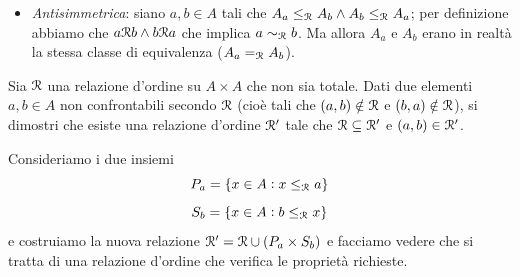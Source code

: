 \documentclass[a4paper]{article}\par \usepackage{style}\par
\begin{document}
\begin{enumerate}
\begin{itemize}
  \item \emph{Antisimmetrica}: siano $ a, b \in A $ tali che $ A_a \leq_{\mathcal{R}} A_b \wedge A_b \leq_{\mathcal{R}} A_a $; per definizione abbiamo che $ a \mathcal{R} b \wedge b \mathcal{R} a $ che implica $ a \sim_{\mathcal{R}} b $. Ma allora $ A_a $ e $ A_b $ erano in realtà la stessa classe di equivalenza ($ A_a =_{\mathcal{R}} A_b $).
  \end{itemize}
\end{enumerate}\par \begin{es}
  Sia $ \mathcal{R} $ una relazione d'ordine su $ A \times A $ che non sia totale. Dati due elementi $ a, b \in A $ non confrontabili secondo $ \mathcal{R} $ (cioè tali che $ (a, b) \notin \mathcal{R} $ e $ (b, a) \notin \mathcal{R} $), si dimostri che esiste una relazione d'ordine $ \mathcal{R}' $ tale che $ \mathcal{R} \subseteq \mathcal{R}' $ e $ (a, b) \in \mathcal{R}' $.
\end{es}\par 
Consideriamo i due insiemi
\[P_a = \{x \in A : x \leq_{\mathcal{R}} a\}\]
\[S_b = \{x \in A : b \leq_{\mathcal{R}} x\}\]
e costruiamo la nuova relazione $ \mathcal{R}' = \mathcal{R} \cup (P_a \times S_b) $ e facciamo vedere che si tratta di una relazione d'ordine che verifica le proprietà richieste.
\end{document}
